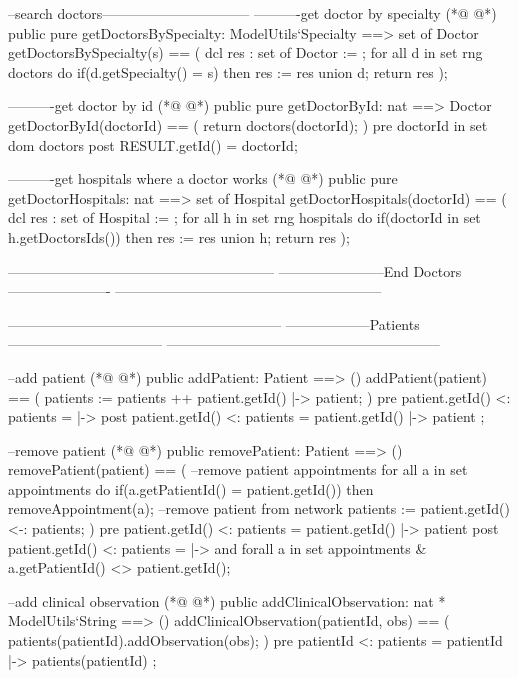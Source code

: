 \begin{vdmpp}[breaklines=true]
  
  --search doctors--------------------------------
  ----------get doctor by specialty
(*@
\label{getDoctorsBySpecialty:201}
@*)
  public pure getDoctorsBySpecialty: ModelUtils`Specialty ==> set of Doctor
   getDoctorsBySpecialty(s) == (
    dcl res : set of Doctor := {};
    for all d in set rng doctors do
      if(d.getSpecialty() = s) then
       res := res union {d};
    return res
   );
  
  ----------get doctor by id
(*@
\label{getDoctorById:211}
@*)
  public pure getDoctorById: nat ==> Doctor
   getDoctorById(doctorId) == (
    return doctors(doctorId);
   )
  pre doctorId in set dom doctors
  post RESULT.getId() = doctorId;
   
  ----------get hospitals where a doctor works
(*@
\label{getDoctorHospitals:219}
@*)
  public pure getDoctorHospitals: nat ==> set of Hospital
   getDoctorHospitals(doctorId) == (
    dcl res : set of Hospital := {};
    for all h in set rng hospitals do
     if(doctorId in set h.getDoctorsIds()) then
      res := res union {h};
    return res
   );
   
  ---------------------------------------------------------
  -----------------------End Doctors ----------------------
  ---------------------------------------------------------
  
  
  -----------------------------------------------------------
  ------------------Patients---------------------------------
  -----------------------------------------------------------
  
  --add patient
(*@
\label{addPatient:238}
@*)
  public addPatient: Patient ==> ()
  addPatient(patient) == (
   patients := patients ++  { patient.getId() |-> patient};
  )
  pre {patient.getId() } <: patients = { |-> }  
  post {patient.getId() } <: patients = { patient.getId() |-> patient };
  
  --remove patient
(*@
\label{removePatient:246}
@*)
  public removePatient: Patient ==> ()
  removePatient(patient) == (
   --remove patient appointments
   for all a in set appointments do 
    if(a.getPatientId() = patient.getId()) then
     removeAppointment(a);
   --remove patient from network
   patients := {patient.getId()} <-: patients;
  )
   pre {patient.getId()} <: patients = { patient.getId() |-> patient } 
  post {patient.getId()} <: patients = { |-> } and forall a in set appointments & a.getPatientId() <> patient.getId();
   
  --add clinical observation
(*@
\label{addClinicalObservation:259}
@*)
  public addClinicalObservation: nat * ModelUtils`String ==> ()
  addClinicalObservation(patientId, obs) == (
   patients(patientId).addObservation(obs);
  )
   pre {patientId} <: patients = { patientId |-> patients(patientId) } ;
   

\end{vdmpp}
